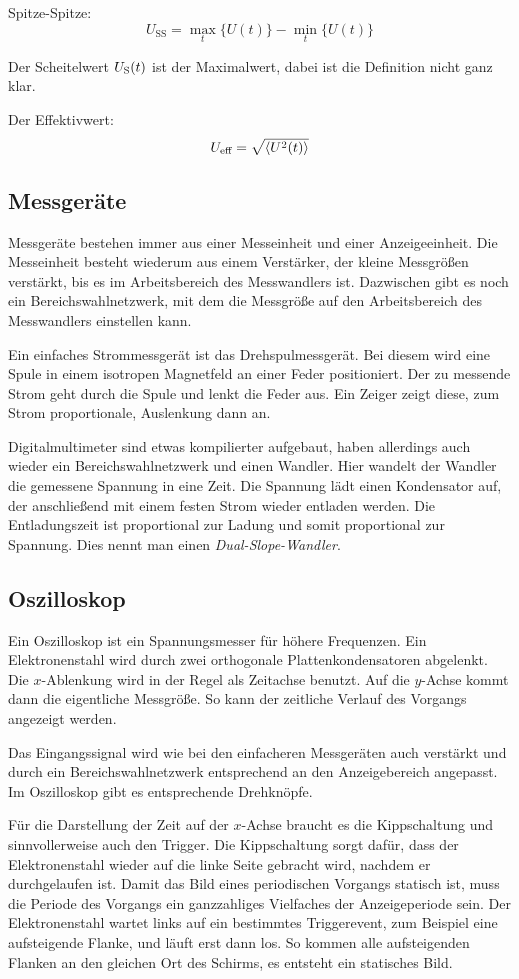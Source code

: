 Spitze-Spitze:
\[
	U_\text{SS} = \max_t \{ U(t) \} - \min_t \{ U(t) \}
\]

Der Scheitelwert $U_\text S(t)$ ist der Maximalwert, dabei ist die Definition
nicht ganz klar.

Der Effektivwert:
\[
	U_\text{eff} = \sqrt{\braket{U^2(t)}}
\]

\subsection{Messgeräte}

Messgeräte bestehen immer aus einer Messeinheit und einer Anzeigeeinheit. Die
Messeinheit besteht wiederum aus einem Verstärker, der kleine Messgrößen
verstärkt, bis es im Arbeitsbereich des Messwandlers ist. Dazwischen gibt es
noch ein Bereichswahlnetzwerk, mit dem die Messgröße auf den Arbeitsbereich des
Messwandlers einstellen kann.

Ein einfaches Strommessgerät ist das Drehspulmessgerät. Bei diesem wird eine
Spule in einem isotropen Magnetfeld an einer Feder positioniert. Der zu
messende Strom geht durch die Spule und lenkt die Feder aus. Ein Zeiger zeigt
diese, zum Strom proportionale, Auslenkung dann an.

Digitalmultimeter sind etwas kompilierter aufgebaut, haben allerdings auch
wieder ein Bereichswahlnetzwerk und einen Wandler. Hier wandelt der Wandler die
gemessene Spannung in eine Zeit. Die Spannung lädt einen Kondensator auf, der
anschließend mit einem festen Strom wieder entladen werden. Die Entladungszeit
ist proportional zur Ladung und somit proportional zur Spannung. Dies nennt man
einen \emph{Dual-Slope-Wandler}.

\subsection{Oszilloskop}

Ein Oszilloskop ist ein Spannungsmesser für höhere Frequenzen. Ein
Elektronenstahl wird durch zwei orthogonale Plattenkondensatoren abgelenkt. Die
$x$-Ablenkung wird in der Regel als Zeitachse benutzt. Auf die $y$-Achse kommt
dann die eigentliche Messgröße. So kann der zeitliche Verlauf des Vorgangs
angezeigt werden.

Das Eingangssignal wird wie bei den einfacheren Messgeräten auch verstärkt und
durch ein Bereichswahlnetzwerk entsprechend an den Anzeigebereich angepasst. Im
Oszilloskop gibt es entsprechende Drehknöpfe.

Für die Darstellung der Zeit auf der $x$-Achse braucht es die Kippschaltung und
sinnvollerweise auch den Trigger. Die Kippschaltung sorgt dafür, dass der
Elektronenstahl wieder auf die linke Seite gebracht wird, nachdem er
durchgelaufen ist. Damit das Bild eines periodischen Vorgangs statisch ist,
muss die Periode des Vorgangs ein ganzzahliges Vielfaches der Anzeigeperiode
sein. Der Elektronenstahl wartet links auf ein bestimmtes Triggerevent, zum
Beispiel eine aufsteigende Flanke, und läuft erst dann los. So kommen alle
aufsteigenden Flanken an den gleichen Ort des Schirms, es entsteht ein
statisches Bild.

